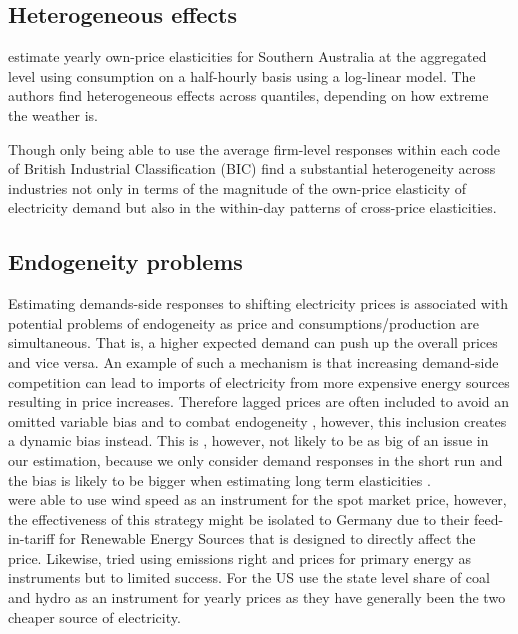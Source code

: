 
\subsection{Heterogeneous effects}
\label{subsec:b_heterogeneity}
\citet{fan2011price} estimate yearly own-price elasticities for Southern Australia at the aggregated level using consumption on a half-hourly basis using a log-linear model. The authors find heterogeneous effects across quantiles, depending on how extreme the weather is. \par\vspace{-1em}
Though only being able to use the average firm-level responses within each code of British Industrial Classification (BIC) \citet{patrick2001estimating} find a substantial heterogeneity across industries not only in terms of the magnitude of the own-price elasticity of electricity demand but also in the within-day patterns of cross-price elasticities. %

\subsection{Endogeneity problems}
\label{subsec:b_endogeneity}
Estimating demands-side responses to shifting electricity prices is associated with potential problems of endogeneity as price and consumptions/production are simultaneous. That is, a higher expected demand can push up the overall prices and vice versa. An example of such a mechanism is that increasing demand-side competition can lead to imports of electricity from more expensive energy sources \citep{burke2017price} resulting in price increases.  Therefore lagged prices are often included to avoid an omitted variable bias and to combat endogeneity \citep{lijesen2007real}, however, this inclusion creates a dynamic bias instead. This is , however, not likely to be as big of an issue in our estimation,  because we only consider demand responses in the short run and the bias is likely to be bigger when estimating long term elasticities \citep{okajima2013estimation}. %
\medskip \\
\citet{bonte2015price} were able to use wind speed as an instrument for the spot market price, however, the effectiveness of this strategy might be isolated to Germany due to their feed-in-tariff for Renewable Energy Sources that is designed to directly affect the price. Likewise, \citet{graf2013measuring} tried using emissions right and prices for primary energy as instruments but to limited success. For the US \citet{burke2017price} use the state level share of coal and hydro as an instrument for yearly prices as they have generally been the two cheaper source of electricity.

